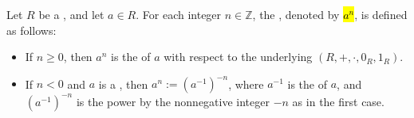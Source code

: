 \begin{definition} \label{definition:exponentiation_in_a_ring}
    Let $R$ be a , and let $a \in R$. For each integer $n \in \mathbb{Z}$, the , denoted by \hl{$a^n$}, is defined as follows:
    \begin{itemize}
        \item If $n \geq 0$, then $a^n$ is the  of $a$ with respect to the underlying  $(R, +, \cdot, 0_R, 1_R)$.
        \item If $n < 0$ and $a$ is a , then $a^n := (a^{-1})^{-n}$, where $a^{-1}$ is the  of $a$, and $(a^{-1})^{-n}$ is the power by the nonnegative integer $-n$ as in the first case.
    \end{itemize}
\end{definition}
